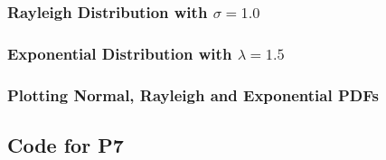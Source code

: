 \documentclass[main.tex]{article}
\begin{document}
    \subsubsection[Rayleigh Distribution]{Rayleigh Distribution with $\sigma = 1.0$}
    \label{app:code-p6-rayleigh}
    
    \subsubsection[Exponential Distribution]{Exponential Distribution with $\lambda = 1.5$}
    \label{app:code-p6-exp}
    
    \subsubsection[All PDFs]{Plotting Normal, Rayleigh and Exponential PDFs}
    \label{app:code-p6-all}
    

    \pagebreak
    \subsection{Code for P7}
    \label{app:code-p7}
    
\end{document}
